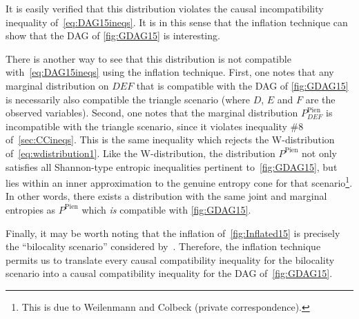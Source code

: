 It is easily verified that this distribution violates the causal incompatibility inequality of~\cref{eq:DAG15ineqs}.  It is in this sense that the inflation technique can show that the DAG of \cref{fig:GDAG15} is interesting. 

There is another way to see that this distribution is not compatible with~\cref{eq:DAG15ineqs} using the inflation technique.  First, one notes that any marginal distribution on $DEF$ that is compatible with the DAG of \cref{fig:GDAG15} is necessarily also compatible the triangle scenario (where $D$, $E$ and $F$ are the observed variables).
Second, one notes that the marginal distribution $P^{\text{Pien}}_{D E F}$ is incompatible with the triangle scenario, since it violates inequality \#8 of~\cref{sec:CCineqs}.  This is the same inequality which rejects the W-distribution of~\cref{eq:wdistribution1}.
Like the W-distribution, the distribution $P^{\text{Pien}}$
 not only satisfies all Shannon-type entropic inequalities pertinent to~\cref{fig:GDAG15}, but lies within an inner approximation to the genuine entropy cone for that scenario\footnote{This is due to Weilenmann and Colbeck (private correspondence).}. In other words, there exists a distribution with the same joint and marginal entropies as  $P^{\text{Pien}}$ which \emph{is} compatible with \cref{fig:GDAG15}.

Finally, it may be worth noting that the inflation of~\cref{fig:Inflated15} is precisely the ``bilocality scenario'' considered by~\citet{BilocalCorrelations}.  Therefore, the inflation technique permits us to translate every causal compatibility inequality for the bilocality scenario into a causal compatibility inequality for the DAG of~\cref{fig:GDAG15}.




